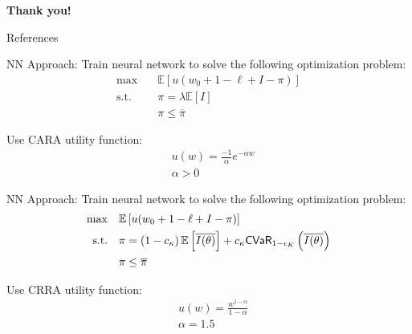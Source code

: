 \documentclass{beamer}
\begin{document}
\begin{frame}[plain]
  \centering
  \vspace{2cm}
  
  {\Large \textbf{Thank you!}}
  
  
  \end{frame}

\begin{frame}{References}
\printbibliography
\end{frame}

\begin{frame}{NN Approach: \cite{chen2023managing}}
  Train neural network to solve the following optimization problem: 
  \begin{align*}
      \max &\quad \mathbb{E} \left [ u(w_0 + 1 - \ell + I -\pi) \right ]\\
      \text{s.t.} & \quad \pi = \lambda \mathbb{E}\left [ I \right ]\\
      & \quad \pi \leq \overline{\pi}
  \end{align*}

  Use CARA utility function:
  \begin{align*}
      & u(w) = \frac{-1}{\alpha} e^{-\alpha w}\\
      & \alpha > 0
  \end{align*}
\end{frame}

\begin{frame}{NN Approach: \cite{chen2023managing}}
  Train neural network to solve the following optimization problem: 
  \begin{align*}
      \max &\quad \mathbb{E} \left [ u(w_0 + 1 - \ell + I -\pi) \right ]\\
      \text{s.t.} & \quad \pi = \left (1-c_{\kappa} \right ) \mathbb{E} \left [ \overline{I(\theta)} \right ] + c_{\kappa} {\sf CVaR}_{1-\epsilon_K} \left( \overline{I(\theta)} \right)\\
      & \quad \pi \leq \overline{\pi}
  \end{align*}

  Use CRRA utility function:
  \begin{align*}
      & u(w) = \frac{w^{1-\alpha}}{1-\alpha}\\
      & \alpha = 1.5
  \end{align*}
\end{frame}
\end{document}
